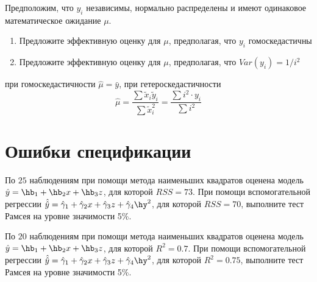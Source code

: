 \documentclass[pdftex,11pt,openany]{book}\usepackage[]{graphicx}\usepackage[]{color}
\begin{document}
\begin{solution}

\end{solution}


\begin{problem}
Предположим, что $y_i$ независимы, нормально распределены и имеют одинаковое математическое ожидание $\mu$.

\begin{enumerate}
\item  Предложите эффективную оценку для $\mu$, предполагая, что $y_i$ гомоскедастичны
\item  Предложите эффективную оценку для $\mu$, предполагая, что $Var(y_i)=1/i^2$
\end{enumerate}
\end{problem}

\begin{solution}
при гомоскедастичности $\hat{\mu}=\bar{y}$, при гетероскедастичности
\[
\hat{\mu}=\frac{\sum \tilde{x}_i \tilde{y}_i}{\sum \tilde{x}_i^2}=\frac{\sum i^2\cdot y_i}{\sum i^2}
\]
\end{solution}


\chapter{Ошибки спецификации}


\begin{problem}
По $25$ наблюдениям при помощи метода наименьших квадратов оценена
модель $\hat{y}=\hb_1+\hb_2 x +\hb_3 z$, для которой $RSS = 73$. При помощи вспомогательной регрессии $\hat{\hat{y}}=\hat{\gamma}_1+\hat{\gamma}_2 x +\hat{\gamma}_3 z+\hat{\gamma}_4 \hy^2$, для которой $RSS = 70$, выполните тест Рамсея на уровне значимости 5\%. 
\end{problem}

\begin{solution}
\end{solution}


\begin{problem}
По $20$ наблюдениям при помощи метода наименьших квадратов оценена
модель $\hat{y}=\hb_1+\hb_2 x +\hb_3 z$, для которой $R^2 = 0.7$. При помощи вспомогательной регрессии $\hat{\hat{y}}=\hat{\gamma}_1+\hat{\gamma}_2 x +\hat{\gamma}_3 z+\hat{\gamma}_4 \hy^2$, для которой $R^2 = 0.75$, выполните тест Рамсея на уровне значимости 5\%. 
\end{problem}

\begin{solution}
\end{solution}
\end{document}
